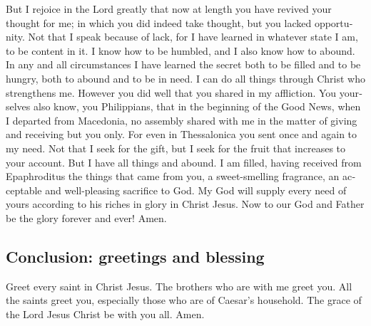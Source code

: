 \begin{paracol}{2}
\begin{otherlanguage}{english}
 But I rejoice in the Lord greatly that now at length you
have revived your thought for me; in which you did indeed take thought,
but you lacked opportunity.  Not that I speak because of
lack, for I have learned in whatever state I am, to be content in it.
 I know how to be humbled, and I also know how to abound.
In any and all circumstances I have learned the secret both to be filled
and to be hungry, both to abound and to be in need.  I
can do all things through Christ who strengthens me. 
However you did well that you shared in my affliction. 
You yourselves also know, you Philippians, that in the beginning of the
Good News, when I departed from Macedonia, no assembly shared with me in
the matter of giving and receiving but you only.  For
even in Thessalonica you sent once and again to my need. 
Not that I seek for the gift, but I seek for the fruit that increases to
your account.  But I have all things and abound. I am
filled, having received from Epaphroditus the things that came from you,
a sweet-smelling fragrance, an acceptable and well-pleasing sacrifice to
God.  My God will supply every need of yours according to
his riches in glory in Christ Jesus.  Now to our God and
Father be the glory forever and ever! Amen.

\hypertarget{conclusion-greetings-and-blessing}{%
\subsection{Conclusion: greetings and
blessing}\label{conclusion-greetings-and-blessing}}

 Greet every saint in Christ Jesus. The brothers who are
with me greet you.  All the saints greet you, especially
those who are of Caesar's household.  The grace of the
Lord Jesus Christ be with you all. Amen. \end{otherlanguage}
\end{paracol}
